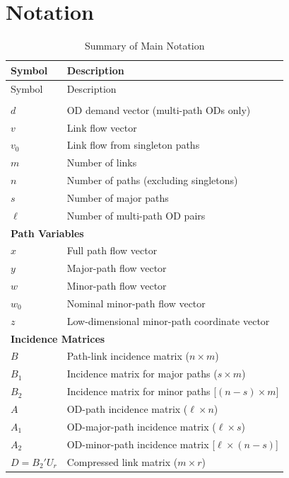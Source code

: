 \documentclass[11pt]{article}
\begin{document}

 


\appendix

\section{Notation}\label{app:notation}

\begin{longtable}{ll}
\caption{Summary of Main Notation} \label{tab:notation} \\
\toprule
Symbol & Description \\
\midrule
\endfirsthead
\toprule
Symbol & Description \\
\midrule
\endhead
\midrule
\endfoot
\bottomrule
\endlastfoot
\multicolumn{2}{l}{\textbf{Network and Demand}} \\
$d$ & OD demand vector (multi-path ODs only) \\
$v$ & Link flow vector \\
$v_0$ & Link flow from singleton paths \\
$m$ & Number of links \\
$n$ & Number of paths (excluding singletons) \\
$s$ & Number of major paths \\
$\ell$ & Number of multi-path OD pairs \\
\midrule
\multicolumn{2}{l}{\textbf{Path Variables}} \\
$x$ & Full path flow vector \\
$y$ & Major-path flow vector \\
$w$ & Minor-path flow vector \\
$w_0$ & Nominal minor-path flow vector \\
$z$ & Low-dimensional minor-path coordinate vector \\
\midrule
\multicolumn{2}{l}{\textbf{Incidence Matrices}} \\
$B$ & Path-link incidence matrix ($n \times m$)\\
$B_1$ & Incidence matrix for major paths ($s \times m$)\\
$B_2$ & Incidence matrix for minor paths [$(n-s) \times m$]\\
$A$ & OD-path incidence matrix ($\ell \times n$)\\
$A_1$ & OD-major-path incidence matrix ($\ell \times s$)\\
$A_2$ & OD-minor-path incidence matrix [$\ell \times (n-s)$]\\
$D = B_2'U_r$ & Compressed link matrix ($m \times r$) \\

\end{longtable}
\end{document}
